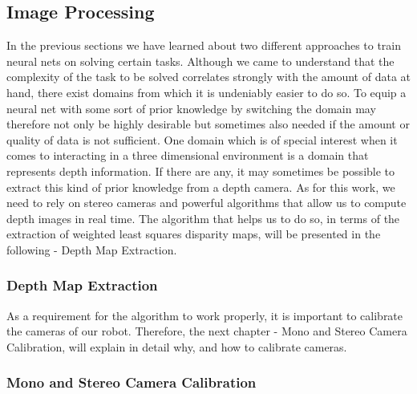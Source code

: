 \subsection{Image Processing}
In the previous sections we have learned about two different approaches to train neural nets on solving certain tasks. Although we came to understand that the complexity of the task to be solved correlates strongly with the amount of data at hand, there exist domains from which it is undeniably easier to do so. To equip a neural net with some sort of prior knowledge by switching the domain may therefore not only be highly desirable but sometimes also needed if the amount or quality of data is not sufficient. One domain which is of special interest when it comes to interacting in a three dimensional environment is a domain that represents depth information. If there are any, it may sometimes be possible to extract this kind of prior knowledge from a depth camera. As for this work, we need to rely on stereo cameras and powerful algorithms that allow us to compute depth images in real time. The algorithm that helps us to do so, in terms of the extraction of weighted least squares disparity maps, will be presented in the following - Depth Map Extraction.
\subsubsection{Depth Map Extraction}



As a requirement for the algorithm to work properly, it is important to calibrate the cameras of our robot. Therefore, the next chapter - Mono and Stereo Camera Calibration, will explain in detail why, and how to calibrate cameras.
\subsubsection{Mono and Stereo Camera Calibration}